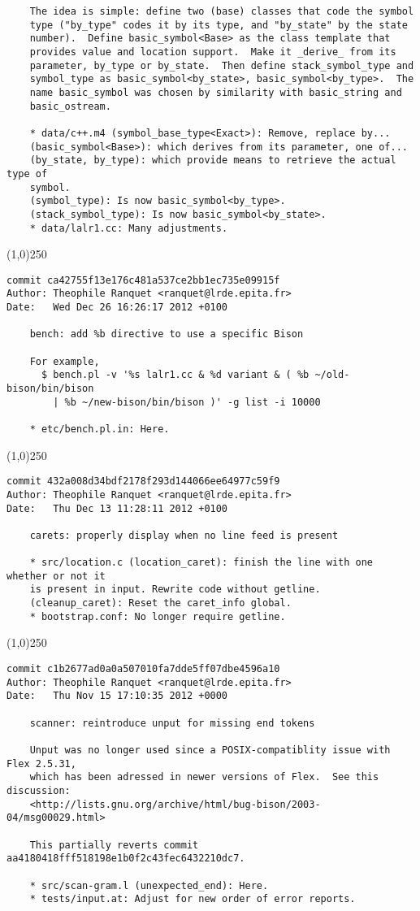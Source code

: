 \begin{verbatim}
    The idea is simple: define two (base) classes that code the symbol
    type ("by_type" codes it by its type, and "by_state" by the state
    number).  Define basic_symbol<Base> as the class template that
    provides value and location support.  Make it _derive_ from its
    parameter, by_type or by_state.  Then define stack_symbol_type and
    symbol_type as basic_symbol<by_state>, basic_symbol<by_type>.  The
    name basic_symbol was chosen by similarity with basic_string and
    basic_ostream.
    
    * data/c++.m4 (symbol_base_type<Exact>): Remove, replace by...
    (basic_symbol<Base>): which derives from its parameter, one of...
    (by_state, by_type): which provide means to retrieve the actual type of
    symbol.
    (symbol_type): Is now basic_symbol<by_type>.
    (stack_symbol_type): Is now basic_symbol<by_state>.
    * data/lalr1.cc: Many adjustments.

\end{verbatim}
\line(1,0){250}
\begin{verbatim}
commit ca42755f13e176c481a537ce2bb1ec735e09915f
Author: Theophile Ranquet <ranquet@lrde.epita.fr>
Date:   Wed Dec 26 16:26:17 2012 +0100

    bench: add %b directive to use a specific Bison
    
    For example,
      $ bench.pl -v '%s lalr1.cc & %d variant & ( %b ~/old-bison/bin/bison
        | %b ~/new-bison/bin/bison )' -g list -i 10000
    
    * etc/bench.pl.in: Here.

\end{verbatim}
\line(1,0){250}
\begin{verbatim}
commit 432a008d34bdf2178f293d144066ee64977c59f9
Author: Theophile Ranquet <ranquet@lrde.epita.fr>
Date:   Thu Dec 13 11:28:11 2012 +0100

    carets: properly display when no line feed is present
    
    * src/location.c (location_caret): finish the line with one whether or not it
    is present in input. Rewrite code without getline.
    (cleanup_caret): Reset the caret_info global.
    * bootstrap.conf: No longer require getline.

\end{verbatim}
\line(1,0){250}
\begin{verbatim}
commit c1b2677ad0a0a507010fa7dde5ff07dbe4596a10
Author: Theophile Ranquet <ranquet@lrde.epita.fr>
Date:   Thu Nov 15 17:10:35 2012 +0000

    scanner: reintroduce unput for missing end tokens
    
    Unput was no longer used since a POSIX-compatiblity issue with Flex 2.5.31,
    which has been adressed in newer versions of Flex.  See this discussion:
    <http://lists.gnu.org/archive/html/bug-bison/2003-04/msg00029.html>
    
    This partially reverts commit aa4180418fff518198e1b0f2c43fec6432210dc7.
    
    * src/scan-gram.l (unexpected_end): Here.
    * tests/input.at: Adjust for new order of error reports.

\end{verbatim}
